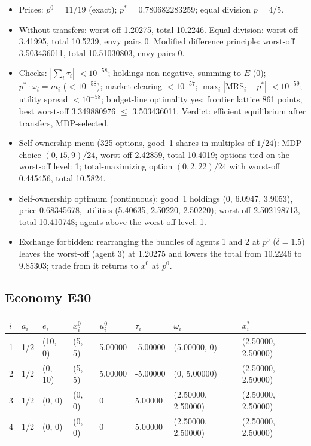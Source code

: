 \begin{itemize}[leftmargin=1.2em,itemsep=0pt,topsep=2pt]\footnotesize
\item Prices: $p^0 = 11/19$ (exact); $p^* = 0.780682283259$; equal division $p = 4/5$.
\item Without transfers: worst-off 1.20275, total 10.2246. Equal division: worst-off 3.41995, total 10.5239, envy pairs 0. Modified difference principle: worst-off 3.503436011, total 10.51030803, envy pairs 0.
\item Checks: $|\sum_i\tau_i|$ $<10^{-58}$; holdings non-negative, summing to $E$ (0); $p^*\cdot\omega_i = m_i$ ($<10^{-58}$); market clearing $<10^{-57}$; $\max_i|\mathrm{MRS}_i - p^*|$ $<10^{-59}$; utility spread $<10^{-58}$; budget-line optimality yes; frontier lattice 861 points, best worst-off 3.349880976 $\leq$ 3.503436011. Verdict: efficient equilibrium after transfers, MDP-selected.
\item Self-ownership menu (325 options, good~1 shares in multiples of $1/24$): MDP choice $(0, 15, 9)/24$, worst-off 2.42859, total 10.4019; options tied on the worst-off level: 1; total-maximizing option $(0, 2, 22)/24$ with worst-off 0.445456, total 10.5824.
\item Self-ownership optimum (continuous): good~1 holdings (0, 6.0947, 3.9053), price 0.68345678, utilities (5.40635, 2.50220, 2.50220); worst-off 2.502198713, total 10.410748; agents above the worst-off level: 1.
\item Exchange forbidden: rearranging the bundles of agents 1 and 2 at $p^0$ ($\delta = 1.5$) leaves the worst-off (agent 3) at 1.20275 and lowers the total from 10.2246 to 9.85303; trade from it returns to $x^0$ at $p^0$.
\end{itemize}

\subsection*{Economy E30}
\label{ec:E30}
{\scriptsize\setlength{\tabcolsep}{3pt}
\begin{tabular}{@{}llllllll@{}}
\toprule
$i$ & $a_i$ & $e_i$ & $x^0_i$ & $u^0_i$ & $\tau_i$ & $\omega_i$ & $x^*_i$ \\
\midrule
1 & 1/2 & (10, 0) & (5, 5) & 5.00000 & -5.00000 & (5.00000, 0) & (2.50000, 2.50000) \\
2 & 1/2 & (0, 10) & (5, 5) & 5.00000 & -5.00000 & (0, 5.00000) & (2.50000, 2.50000) \\
3 & 1/2 & (0, 0) & (0, 0) & 0 & 5.00000 & (2.50000, 2.50000) & (2.50000, 2.50000) \\
4 & 1/2 & (0, 0) & (0, 0) & 0 & 5.00000 & (2.50000, 2.50000) & (2.50000, 2.50000) \\
\bottomrule\end{tabular}}

